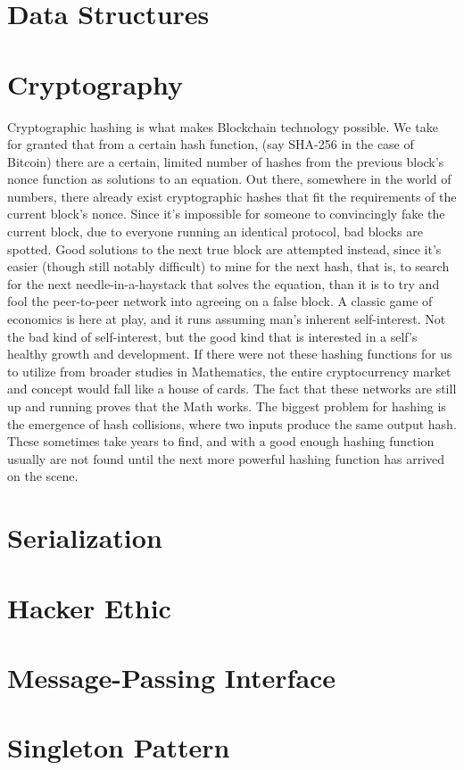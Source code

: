 \documentclass[10pt,a4paper,leqno,bibliography=totoc]{scrartcl}
\newenvironment{alphafootnotes}
{\par\edef\savedfootnotenumber{\number\value{footnote}}
\renewcommand{\thefootnote}{\alph{footnote}}
\setcounter{footnote}{0}}
{\par\setcounter{footnote}{\savedfootnotenumber}}
\begin{document}
\begin{alphafootnotes}
\begin{multicols*}{2}
	\section{Data Structures}
	\section{Cryptography} Cryptographic hashing is what makes Blockchain technology possible. We take for granted that from a certain hash function, (say SHA-256 in the case of Bitcoin) there are a certain, limited number of hashes from the previous block's nonce function as solutions to an equation. Out there, somewhere in the world of numbers, there already exist cryptographic hashes that fit the requirements of the current block's nonce. Since it's impossible for someone to convincingly fake the current block, due to everyone running an identical protocol, bad blocks are spotted. Good solutions to the next true block are attempted instead, since it's easier (though still notably difficult)  to mine for the next hash, that is, to search for the next needle-in-a-haystack that solves the equation, than it is to try and fool the peer-to-peer network into agreeing on a false block. A classic game of economics is here at play, and it runs assuming man's inherent self-interest. Not the bad kind of self-interest, but the good kind that is interested in a self's healthy growth and development. If there were not these hashing functions for us to utilize from broader studies in Mathematics, the entire cryptocurrency market and concept would fall like a house of cards. The fact that these networks are still up and running proves that the Math works. The biggest problem for hashing is the emergence of hash collisions, where two inputs produce the same output hash. These sometimes take years to find, and with a good enough hashing function usually are not found until the next more powerful hashing function has arrived on the scene.
	\section{Serialization}
	\section{Hacker Ethic}
	\section{Message-Passing Interface}
	\section{Singleton Pattern}

\end{multicols*}
\end{alphafootnotes}
\end{document}
